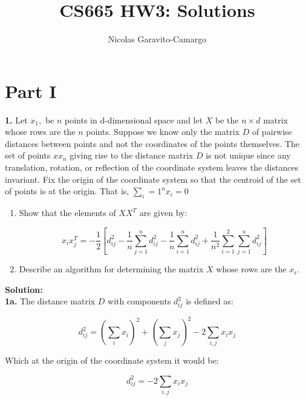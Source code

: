 \documentclass[14pt]{article}
\title{CS665 HW3: Solutions}
\author{Nicolas Garavito-Camargo}
\begin{document}
\maketitle

\section{Part I}

\begin{mdframed}
\textbf{1.} Let $x_1, $ be $n$ points in d-dimensional  space  and  let
$X$ be the $n\times d$ matrix whose rows are the
$n$ points.  Suppose we know only the matrix $D$
of pairwise distances between points and not the coordinates of the points
themselves.  The set of points $x x_n$  giving  rise  to  the  distance  matrix
$D$ is  not  unique  since  any  translation,
rotation,  or  reflection  of  the  coordinate  system  leaves  the
distances  invariant.   Fix  the origin  of  the  coordinate  system  so  that  the  centroid  of  the
set  of  points  is  at  the  origin. That is, $\sum_i=1^n x_i = 0$

\begin{enumerate}
\item Show that the elements of $XX^T$ are given by:

\begin{equation}
x_i x_j^T = - \dfrac{1}{2} \left[ d_{ij}^2 - \dfrac{1}{n} \sum_{j=1}^n
d_{ij}^2 - \dfrac{1}{n}\sum_{i=1}^n d_{ij}^2 + \dfrac{1}{n^2}
\sum_{i=1}^2 \sum_{j=1}^n d_{ij}^2 \right]
\end{equation}

\item Describe an algorithm for determining the matrix $X$ whose rows
are the $x_i$.

\end{enumerate}

\end{mdframed}

\textbf{Solution:}\\

\textbf{1a.} The distance matrix $D$ with components $d_{ij}^2$ is defined as:

\begin{equation}
d_{ij}^{2} = (\sum_{i} x_{i})^2 + (\sum_{j} x_{j})^2 - 2 \sum_{i,j} x_i
x_j
\end{equation}

Which at the origin of the coordinate system it would be:

\begin{equation}\label{eq:dij}
d_{ij}^{2} =  - 2 \sum_{i,j} x_i x_j
\end{equation}
\end{document}
